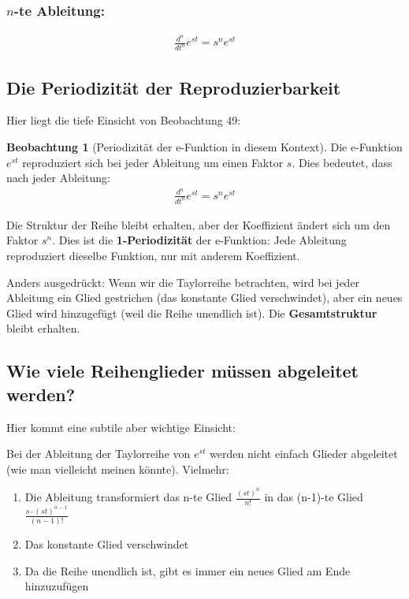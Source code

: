 \documentclass[a4paper, 12pt, twoside, openright]{report}
\theoremstyle{definition}
\newtheorem{beobachtung}{Beobachtung}
\theoremstyle{definition}
\begin{document}
\subsubsection*{$n$-te Ableitung:}

\begin{align}
	\frac{d^n}{dt^n} e^{st} = s^n e^{st}
\end{align}

\subsection{Die Periodizität der Reproduzierbarkeit}

Hier liegt die tiefe Einsicht von Beobachtung 49:

\begin{beobachtung}[Periodizität der e-Funktion in diesem Kontext]
	Die e-Funktion $e^{st}$ reproduziert sich bei jeder Ableitung um einen Faktor $s$. Dies bedeutet, dass nach jeder Ableitung:
	\begin{align}
		\frac{d^n}{dt^n} e^{st} = s^n e^{st}
	\end{align}
	
	Die Struktur der Reihe bleibt erhalten, aber der Koeffizient ändert sich um den Faktor $s^n$. Dies ist die \textbf{1-Periodizität} der e-Funktion: Jede Ableitung reproduziert dieselbe Funktion, nur mit anderem Koeffizient.
	
	Anders ausgedrückt: Wenn wir die Taylorreihe betrachten, wird bei jeder Ableitung ein Glied gestrichen (das konstante Glied verschwindet), aber ein neues Glied wird hinzugefügt (weil die Reihe unendlich ist). Die \textbf{Gesamtstruktur} bleibt erhalten.
\end{beobachtung}

\subsection{Wie viele Reihenglieder müssen abgeleitet werden?}

Hier kommt eine subtile aber wichtige Einsicht:

Bei der Ableitung der Taylorreihe von $e^{st}$ werden nicht einfach Glieder abgeleitet (wie man vielleicht meinen könnte). Vielmehr:

\begin{enumerate}
	\item Die Ableitung transformiert das n-te Glied $\frac{(st)^n}{n!}$ in das (n-1)-te Glied $\frac{s \cdot (st)^{n-1}}{(n-1)!}$
	\item Das konstante Glied verschwindet
	\item Da die Reihe unendlich ist, gibt es immer ein neues Glied am Ende hinzuzufügen
\end{enumerate}
\end{document}
